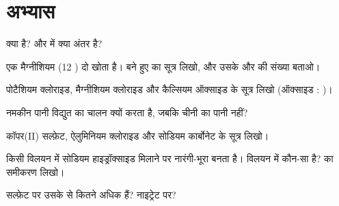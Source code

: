 \section{अभ्यास}

\begin{exercise}[$\star$]\label{exo:g9:ions:1}
 क्या है?  और  में क्या अंतर है?
\end{exercise}

\begin{exercise}[$\star$]\label{exo:g9:ions:2}
एक मैग्नीशियम  (12 ) दो  खोता है। बने हुए  का सूत्र
लिखो, और उसके  और  की संख्या बताओ।
\end{exercise}

\begin{exercise}[$\star$]\label{exo:g9:ions:3}
पोटैशियम क्लोराइड, मैग्नीशियम क्लोराइड और कैल्सियम ऑक्साइड के सूत्र लिखो
(ऑक्साइड : )।
\end{exercise}

\begin{exercise}[$\star$]\label{exo:g9:ions:4}
नमकीन पानी विद्युत का चालन क्यों करता है, जबकि चीनी का पानी नहीं?
\end{exercise}

\begin{exercise}[$\star\star$]\label{exo:g9:ions:5}
कॉपर(II) सल्फ़ेट, ऐलुमिनियम क्लोराइड और सोडियम
कार्बोनेट के सूत्र लिखो।
\end{exercise}

\begin{exercise}[$\star\star$]\label{exo:g9:ions:6}
किसी विलयन में सोडियम हाइड्रॉक्साइड मिलाने पर नारंगी-भूरा  बनता है।
विलयन में कौन-सा  है?  का
समीकरण लिखो।
\end{exercise}

\begin{exercise}[$\star\star$]\label{exo:g9:ions:7}
सल्फ़ेट   पर उसके  से कितने  अधिक
हैं? नाइट्रेट   पर?
\end{exercise}

